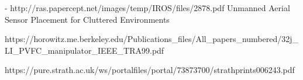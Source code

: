 %


- http://ras.papercept.net/images/temp/IROS/files/2878.pdf
Unmanned Aerial Sensor Placement for Cluttered Environments

https://horowitz.me.berkeley.edu/Publications_files/All_papers_numbered/32j_LI_PVFC_manipulator_IEEE_TRA99.pdf

https://pure.strath.ac.uk/ws/portalfiles/portal/73873700/strathprints006243.pdf